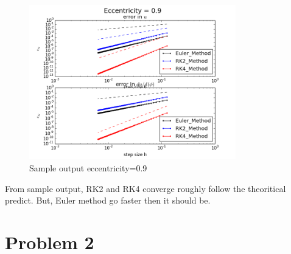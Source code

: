 \documentclass[12pt]{article}
\begin{document}
\begin{figure}[h!]
	\begin{center}
		\includegraphics[width=0.8\textwidth]{error_ecc09.png}
		\caption{Sample output eccentricity=0.9}
		\label{fig3}
	\end{center}
\end{figure}
From sample output, RK2 and RK4 converge roughly follow the theoritical predict. But, Euler method go faster then it should be.


\section{Problem 2} 
\end{document}
